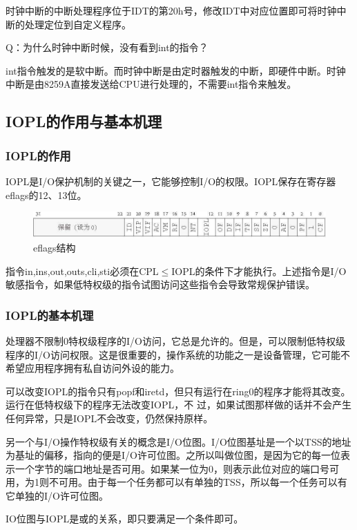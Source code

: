 \documentclass[UTF8,12pt]{ctexart}
\begin{document}
    时钟中断的中断处理程序位于IDT的第20h号，修改IDT中对应位置即可将时钟中断的处理定位到自定义程序。
    
    Q：为什么时钟中断时候，没有看到int的指令？
    
    int指令触发的是软中断。而时钟中断是由定时器触发的中断，即硬件中断。时钟中断是由8259A直接发送给CPU进行处理的，不需要int指令来触发。
    
    \subsection{IOPL的作用与基本机理}
    \subsubsection{IOPL的作用}
    IOPL是I/O保护机制的关键之一，它能够控制I/O的权限。IOPL保存在寄存器eflags的12、13位。
    \begin{figure}[H]
        \centering
        \includegraphics[width=14cm]{images/IOPL.png}
        \caption{eflags结构}
        \label{eflags}
    \end{figure}
    
    指令in,ins,out,outs,cli,sti必须在CPL$\leq$IOPL的条件下才能执行。上述指令是I/O敏感指令，如果低特权级的指令试图访问这些指令会导致常规保护错误。
    
    \subsubsection{IOPL的基本机理}
    处理器不限制0特权级程序的I/O访问，它总是允许的。但是，可以限制低特权级程序的I/O访问权限。这是很重要的，操作系统的功能之一是设备管理，它可能不希望应用程序拥有私自访问外设的能力。
    
    可以改变IOPL的指令只有popf和iretd，但只有运行在ring0的程序才能将其改变。运行在低特权级下的程序无法改变IOPL，不 过，如果试图那样做的话并不会产生任何异常，只是IOPL不会改变，仍然保持原样。
    
    另一个与I/O操作特权级有关的概念是I/O位图。I/O位图基址是一个以TSS的地址为基址的偏移，指向的便是I/O许可位图。之所以叫做位图，是因为它的每一位表示一个字节的端口地址是否可用。如果某一位为0，则表示此位对应的端口号可用，为1则不可用。由于每一个任务都可以有单独的TSS，所以每一个任务可以有它单独的I/O许可位图。
    
    IO位图与IOPL是或的关系，即只要满足一个条件即可。
    
\end{document}
